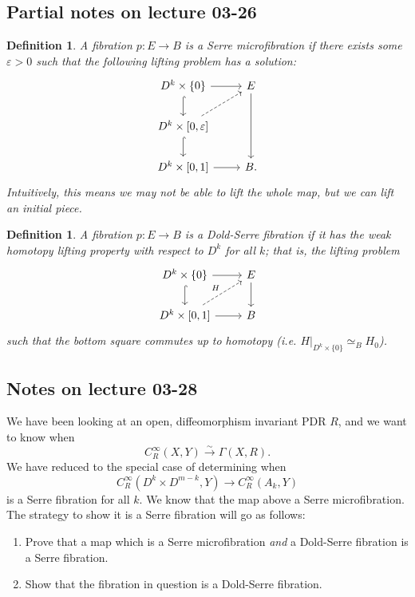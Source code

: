\documentclass{article}
\newtheorem{definition}[theorem]{Definition}
\newtheorem{proposed work}[theorem]{Proposed Work}
\theoremstyle{definition}
\begin{document}
\subsection{Partial notes on lecture 03-26}

\begin{definition}
A fibration $p: E \to B$ is a \emph{Serre microfibration} if there exists some $\varepsilon > 0$ such that the following lifting problem has a solution:
\begin{equation*}
\begin{tikzcd}
D^k \times \{0\} \arrow[r] \arrow[d,hookrightarrow] & E \arrow[dd] \\
D^{k} \times [0,\varepsilon] \arrow[d,hookrightarrow] \arrow[ur,dashed] & \\
D^k \times [0,1] \arrow[r] & B.
\end{tikzcd}
\end{equation*}
Intuitively, this means we may not be able to lift the whole map, but we can lift an initial piece.
\end{definition}

\begin{definition}
A fibration $p:E \to B$ is a \emph{Dold-Serre} fibration if it has the weak homotopy lifting property with respect to $D^k$ for all $k$; that is, the lifting problem
\begin{equation*}
\begin{tikzcd}
D^k \times \{0\} \arrow[r] \arrow[d, hookrightarrow] & E \arrow[d] \\
D^k \times [0,1] \arrow[ur, dashed, "H"] \arrow[r] & B
\end{tikzcd}
\end{equation*}
such that the bottom square commutes up to homotopy (i.e. $H|_{D^k \times \{0\}} \simeq_B H_0$).
\end{definition}

\subsection{Notes on lecture 03-28}
We have been looking at an open, diffeomorphism invariant PDR $R$, and we want to know when
\begin{equation*}
C_R^\infty(X,Y) \overset{\sim}{\to} \Gamma(X,R).
\end{equation*}
We have reduced to the special case of determining when 
\begin{equation*}
C_R^\infty(D^k \times D^{m-k}, Y) \to C_R^\infty(A_k, Y)
\end{equation*}
is a Serre fibration for all $k$. We know that the map above a Serre microfibration. The strategy to show it is a Serre fibration will go as follows:
\begin{enumerate}
\item Prove that a map which is a Serre microfibration \emph{and} a Dold-Serre fibration is a Serre fibration. 

\item Show that the fibration in question is a Dold-Serre fibration.
\end{enumerate}
\end{document}
